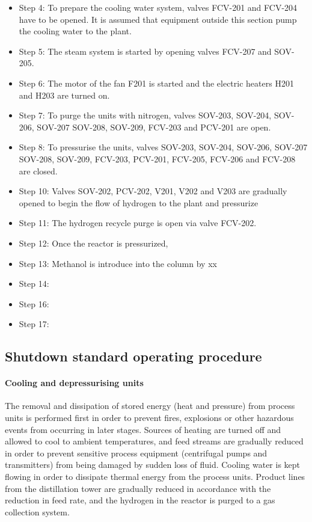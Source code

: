 \begin{itemize}
    \item Step 4: To prepare the cooling water system, valves FCV-201 and FCV-204 have to be opened. It is assumed that equipment outside this section pump the cooling water to the plant.
    \item Step 5: The steam system is started by opening valves FCV-207 and SOV-205.
    \item Step 6: The motor of the fan F201 is started and the electric heaters H201 and H203 are turned on. 
    \item Step 7: To purge the units with nitrogen, valves SOV-203, SOV-204, SOV-206, SOV-207 SOV-208, SOV-209, FCV-203 and PCV-201 are open. 
    \item Step 8: To pressurise the units, valves SOV-203, SOV-204, SOV-206, SOV-207 SOV-208, SOV-209, FCV-203, PCV-201, FCV-205, FCV-206 and FCV-208 are closed. 
    \item Step 10: Valves SOV-202, PCV-202, V201, V202 and V203 are gradually opened to begin the flow of hydrogen to the plant and pressurize 
    \item Step 11: The hydrogen recycle purge is open via valve FCV-202.
    \item Step 12: Once the reactor is pressurized,
    \item Step 13: Methanol is introduce into the column by xx
    \item Step 14:
    \item Step 16:
    \item Step 17:
\end{itemize}


\subsection{Shutdown standard operating procedure}

\paragraph{Cooling and depressurising units}
The removal and dissipation of stored energy (heat and pressure) from process units is performed first in order to prevent fires, explosions or other hazardous events from occurring in later stages. Sources of heating are turned off and allowed to cool to ambient temperatures, and feed streams are gradually reduced in order to prevent sensitive process equipment (centrifugal pumps and transmitters) from being damaged by sudden loss of fluid. Cooling water is kept flowing in order to dissipate thermal energy from the process units. Product lines from the distillation tower are gradually reduced in accordance with the reduction in feed rate, and the hydrogen in the reactor is purged to a gas collection system.

